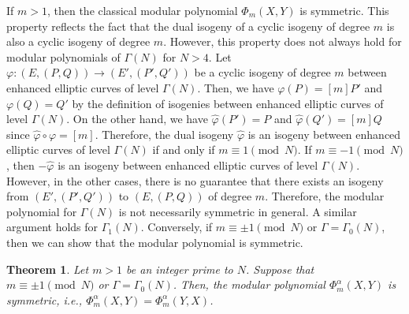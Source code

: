 \documentclass{amsart}
\newtheorem{theorem}{Theorem}[section]
\theoremstyle{definition}
\theoremstyle{remark}
\numberwithin{equation}{section}
\begin{document}
If $m > 1$, then the classical modular polynomial $\Phi_m(X, Y)$ is symmetric.
This property reflects the fact that the dual isogeny of a cyclic isogeny of degree $m$ is also
a cyclic isogeny of degree $m$.
However, this property does not always hold
for modular polynomials of $\Gamma(N)$ for $N > 4$.
Let $\varphi : (E, (P, Q)) \to (E', (P', Q'))$ be a cyclic isogeny of degree $m$
between enhanced elliptic curves of level $\Gamma(N)$.
Then, we have $\varphi(P) = [m]P'$ and $\varphi(Q) = Q'$
by the definition of isogenies between
enhanced elliptic curves of level $\Gamma(N)$.
On the other hand, we have $\hat{\varphi}(P') = P$ and $\hat{\varphi}(Q') = [m]Q$
since $\hat{\varphi}\circ \varphi = [m]$.
Therefore, the dual isogeny $\hat{\varphi}$
is an isogeny between enhanced elliptic curves of level $\Gamma(N)$
if and only if $m \equiv 1 \pmod{N}$.
If $m \equiv -1 \pmod{N}$,
then $-\hat{\varphi}$ is an isogeny between enhanced elliptic curves of level $\Gamma(N)$.
However, in the other cases, there is no guarantee that
there exists an isogeny from $(E', (P', Q'))$ to $(E, (P, Q))$ of degree $m$.
Therefore, the modular polynomial for $\Gamma(N)$
is not necessarily symmetric in general.
A similar argument holds for $\Gamma_1(N)$.
Conversely, if $m \equiv \pm 1 \pmod{N}$ or $\Gamma = \Gamma_0(N)$,
then we can show that the modular polynomial is symmetric.
\begin{theorem}\label{thm:symmetry_of_modular_polynomial}
    Let $m > 1$ be an integer prime to $N$.
    Suppose that
    $m \equiv \pm 1 \pmod{N}$ or $\Gamma = \Gamma_0(N)$.
    Then, the modular polynomial $\Phi_m^{\alpha}(X, Y)$ is symmetric,
    i.e., $\Phi_m^{\alpha}(X, Y) = \Phi_m^{\alpha}(Y, X)$.
\end{theorem}
\end{document}
